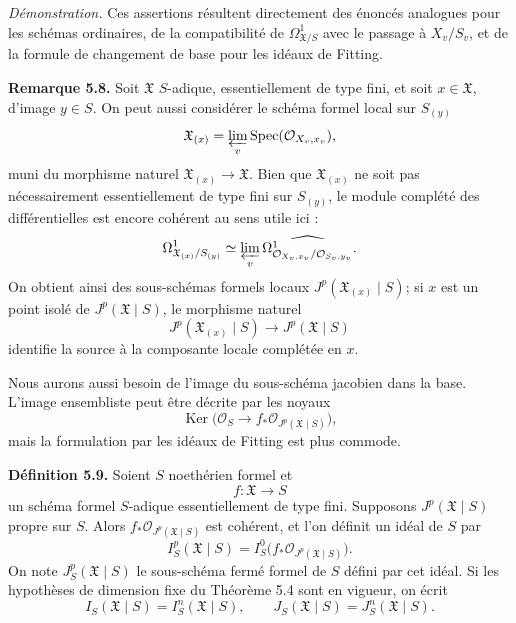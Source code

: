 \documentclass[11pt]{article}
\providecommand{\Spec}{\operatorname{Spec}}
\providecommand{\Ker}{\operatorname{Ker}}
\providecommand{\Oo}{\mathcal O}
\begin{document}
\emph{Démonstration.}  Ces assertions résultent directement des énoncés analogues pour les schémas ordinaires, de la compatibilité de \(\Omega^1_{\mathfrak X/S}\) avec le passage à \(X_v/S_v\), et de la formule de changement de base pour les idéaux de Fitting.

\textbf{Remarque 5.8.}  Soit \(\mathfrak X\) \(S\)-adique, essentiellement de type fini, et soit \(x\in\mathfrak X\), d'image \(y\in S\).  On peut aussi considérer le schéma formel local sur \(S_{(y)}\)
\[
        \mathfrak X_{(x)}=\varprojlim_v \Spec(\Oo_{X_v,x_v}),
\]
muni du morphisme naturel \(\mathfrak X_{(x)}\to\mathfrak X\).  Bien que \(\mathfrak X_{(x)}\) ne soit pas nécessairement essentiellement de type fini sur \(S_{(y)}\), le module complété des différentielles est encore cohérent au sens utile ici :
\[
        \Omega^1_{\mathfrak X_{(x)}/S_{(y)}}
        \simeq
        \varprojlim_v \widehat{\Omega^1_{\Oo_{X_v,x_v}/\Oo_{S_v,y_v}}}.
\]
On obtient ainsi des sous-schémas formels locaux \(J^p(\mathfrak X_{(x)}\mid S)\); si \(x\) est un point isolé de \(J^p(\mathfrak X\mid S)\), le morphisme naturel
\[
        J^p(\mathfrak X_{(x)}\mid S)\longrightarrow J^p(\mathfrak X\mid S)
\]
identifie la source à la composante locale complétée en \(x\).

Nous aurons aussi besoin de l'image du sous-schéma jacobien dans la base.  L'image ensembliste peut être décrite par les noyaux
\[
        \Ker\bigl(\Oo_S\to f_*\Oo_{J^p(\mathfrak X\mid S)}\bigr),
\]
mais la formulation par les idéaux de Fitting est plus commode.

\textbf{Définition 5.9.}  Soient \(S\) noethérien formel et
\[
        f:\mathfrak X\longrightarrow S
\]
un schéma formel \(S\)-adique essentiellement de type fini.  Supposons \(J^p(\mathfrak X\mid S)\) propre sur \(S\).  Alors \(f_*\Oo_{J^p(\mathfrak X\mid S)}\) est cohérent, et l'on définit un idéal de \(S\) par
\[
        I^p_S(\mathfrak X\mid S)
        =
        I^0_S\bigl(f_*\Oo_{J^p(\mathfrak X\mid S)}\bigr).
\]
On note \(J^p_S(\mathfrak X\mid S)\) le sous-schéma fermé formel de \(S\) défini par cet idéal.  Si les hypothèses de dimension fixe du Théorème 5.4 sont en vigueur, on écrit
\[
        I_S(\mathfrak X\mid S)=I^n_S(\mathfrak X\mid S),
        \qquad
        J_S(\mathfrak X\mid S)=J^n_S(\mathfrak X\mid S).
\]
\end{document}
